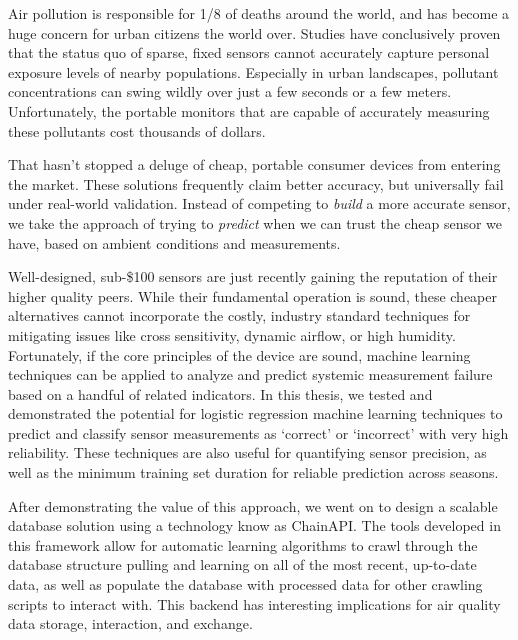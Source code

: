 % 
% 
%


Air pollution is responsible for 1/8 of deaths around the world, and has become a huge concern for urban citizens the world over.  Studies have conclusively proven that the status quo of sparse, fixed sensors cannot accurately capture personal exposure levels of nearby populations.  Especially in urban landscapes, pollutant concentrations can swing wildly over just a few seconds or a few meters.  Unfortunately, the portable monitors  that are capable of accurately measuring these pollutants cost thousands of dollars.
  
That hasn't stopped a deluge of cheap, portable consumer devices from entering the market.  These solutions frequently claim better accuracy, but universally fail under real-world validation.  Instead of competing to \textit{build} a more accurate sensor, we take the approach of trying to \textit{predict} when we can trust the cheap sensor we have, based on ambient conditions and measurements.

Well-designed, sub-\$100 sensors are just recently gaining the reputation of their higher quality peers.  While their fundamental operation is sound, these cheaper alternatives cannot incorporate the costly, industry standard techniques for mitigating issues like cross sensitivity, dynamic airflow, or high humidity.  Fortunately, if the core principles of the device are sound, machine learning techniques can be applied to analyze and predict systemic measurement failure based on a handful of related indicators.  In this thesis, we tested and demonstrated the potential for logistic regression machine learning techniques to predict and classify sensor measurements as `correct' or `incorrect' with very high reliability.  These techniques are also useful for quantifying sensor precision, as well as the minimum training set duration for reliable prediction across seasons. 

After demonstrating the value of this approach, we went on to design a scalable database solution using a technology know as ChainAPI.  The tools developed in this framework allow for automatic learning algorithms to crawl through the database structure pulling and learning on all of the most recent, up-to-date data, as well as populate the database with processed data for other crawling scripts to interact with.  This backend has interesting implications for air quality data storage, interaction, and exchange.

